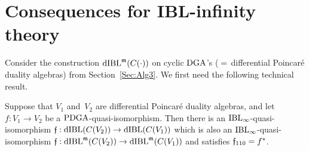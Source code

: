 \documentclass[\MainFolder/Text.tex]{subfiles}
\begin{document}
\section{Consequences for IBL-infinity theory}\label{Section:FuncIBL}

Consider the construction $\mathrm{dIBL}^{\mathfrak{m}}(C(\cdot))$ on cyclic $\mathrm{DGA}$'s ($=$\,differential Poincar\'e duality algebras) from Section~\ref{Sec:Alg3}. We first need the following technical result.

\begin{Proposition}\label{Prop:Functorialityo}
Suppose that $V_1$ and~$V_2$ are differential Poincar\'e duality algebras, and let $f: V_1 \rightarrow V_2$ be a $\mathrm{PDGA}$-quasi-isomorphism.
Then there is an $\mathrm{IBL}_\infty$-quasi-isomorphism $\mathfrak{f}: \mathrm{dIBL}(C(V_2)) \rightarrow \mathrm{dIBL}(C(V_1))$ which is also an $\mathrm{IBL}_\infty$-quasi-isomorphism $\mathfrak{f}: \mathrm{dIBL}^{\mathfrak{m}}(C(V_2)) \rightarrow \mathrm{dIBL}^{\mathfrak{m}}(C(V_1))$ and satisfies $\mathfrak{f}_{110} = f^*$. 
\end{Proposition}
\end{document}
